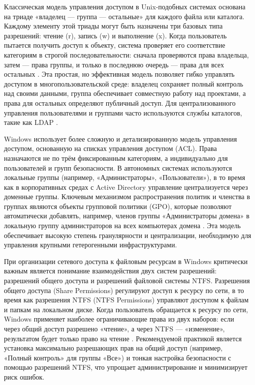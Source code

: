 \documentclass{SibFU-docs}
\begin{document}

Классическая модель управления доступом в Unix-подобных системах основана на триаде «владелец — группа — остальные» для каждого файла или каталога. Каждому элементу этой триады могут быть назначены три базовых типа разрешений: чтение (r), запись (w) и выполнение (x). Когда пользователь пытается получить доступ к объекту, система проверяет его соответствие категориям в строгой последовательности: сначала проверяются права владельца, затем — права группы, и только в последнюю очередь — права для всех остальных \cite{nersc2012unix}. Эта простая, но эффективная модель позволяет гибко управлять доступом в многопользовательской среде: владелец сохраняет полный контроль над своими данными, группа обеспечивает совместную работу над проектами, а права для остальных определяют публичный доступ. Для централизованного управления пользователями и группами часто используются службы каталогов, такие как LDAP \cite{harvard2025permissions}.


Windows использует более сложную и детализированную модель управления доступом, основанную на списках управления доступом (ACL). Права назначаются не по трём фиксированным категориям, а индивидуально для пользователей и групп безопасности. В автономных системах используются локальные группы (например, «Администраторы», «Пользователи»), в то время как в корпоративных средах с Active Directory управление централизуется через доменные группы. Ключевым механизмом распространения политик и членства в группах являются объекты групповой политики (GPO), которые позволяют автоматически добавлять, например, членов группы «Администраторы домена» в локальную группу администраторов на всех компьютерах домена \cite{woshub2025localadmin}. Эта модель обеспечивает высокую степень гранулярности и централизации, необходимую для управления крупными гетерогенными инфраструктурами.


При организации сетевого доступа к файловым ресурсам в Windows критически важным является понимание взаимодействия двух систем разрешений: разрешений общего доступа и разрешений файловой системы NTFS. Разрешения общего доступа (Share Permissions) регулируют доступ к ресурсу по сети, в то время как разрешения NTFS (NTFS Permissions) управляют доступом к файлам и папкам на локальном диске. Когда пользователь обращается к ресурсу по сети, Windows применяет наиболее ограничивающие права из двух наборов: если через общий доступ разрешено «чтение», а через NTFS — «изменение», результатом будет только право на чтение \cite{netwrix2025ntfs}. Рекомендуемой практикой является установка максимально разрешающих прав на общий доступ (например, «Полный контроль» для группы «Все») и тонкая настройка безопасности с помощью разрешений NTFS, что упрощает администрирование и минимизирует риск ошибок.
\end{document}
